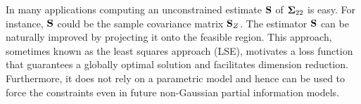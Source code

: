 \documentclass[11pt]{article}
\newcommand{\COR}{\text{COR}}
\theoremstyle{definition}
\theoremstyle{definition}
\def\bSigma{{\bf \Sigma}}
\def\M{{\bf M}}
\def\SS{{\bf S}}
\def\Tr{\text{tr}}
\begin{document}
In many applications computing an unconstrained estimate $\SS$ of $\bSigma_{22}$ is easy. For instance, $\SS$ could be the sample covariance matrix  $\SS_Z$. The estimator $\SS$ can be naturally improved by projecting it onto the feasible region. This approach, sometimes known as the least squares approach (LSE), 
motivates a loss function that guarantees a globally optimal solution and facilitates dimension reduction. Furthermore, it does not rely on a parametric model and hence can be used to force the constraints even in future non-Gaussian partial information models. 
%
%
\end{document}
